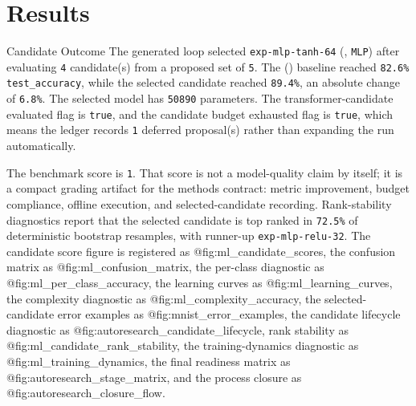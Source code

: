 \documentclass[
  ignorenonframetext,
]{beamer}
\author{\texorpdfstring{}{}}
\date{}
\begin{document}
\section{Results}\label{sec:results}

\begin{frame}{Candidate Outcome}
\protect{}\label{sec:candidate-outcome}
The generated loop selected \texttt{exp-mlp-tanh-64}
(, \texttt{MLP}) after evaluating
\texttt{4} candidate(s) from a proposed set of \texttt{5}. The
 ()
baseline reached \texttt{82.6\%} \texttt{test\_accuracy}, while the
selected candidate reached \texttt{89.4\%}, an absolute change of
\texttt{6.8\%}. The selected model has \texttt{50890} parameters. The
transformer-candidate evaluated flag is \texttt{true}, and the candidate
budget exhausted flag is \texttt{true}, which means the ledger records
\texttt{1} deferred proposal(s) rather than expanding the run
automatically.

The benchmark score is \texttt{1}. That score is not a model-quality
claim by itself; it is a compact grading artifact for the methods
contract: metric improvement, budget compliance, offline execution, and
selected-candidate recording. Rank-stability diagnostics report that the
selected candidate is top ranked in \texttt{72.5\%} of deterministic
bootstrap resamples, with runner-up \texttt{exp-mlp-relu-32}. The
candidate score figure is registered as @fig:ml\_candidate\_scores, the
confusion matrix as @fig:ml\_confusion\_matrix, the per-class diagnostic
as @fig:ml\_per\_class\_accuracy, the learning curves as
@fig:ml\_learning\_curves, the complexity diagnostic as
@fig:ml\_complexity\_accuracy, the selected-candidate error examples as
@fig:mnist\_error\_examples, the candidate lifecycle diagnostic as
@fig:autoresearch\_candidate\_lifecycle, rank stability as
@fig:ml\_candidate\_rank\_stability, the training-dynamics diagnostic as
@fig:ml\_training\_dynamics, the final readiness matrix as
@fig:autoresearch\_stage\_matrix, and the process closure as
@fig:autoresearch\_closure\_flow.


\end{frame}
\end{document}
